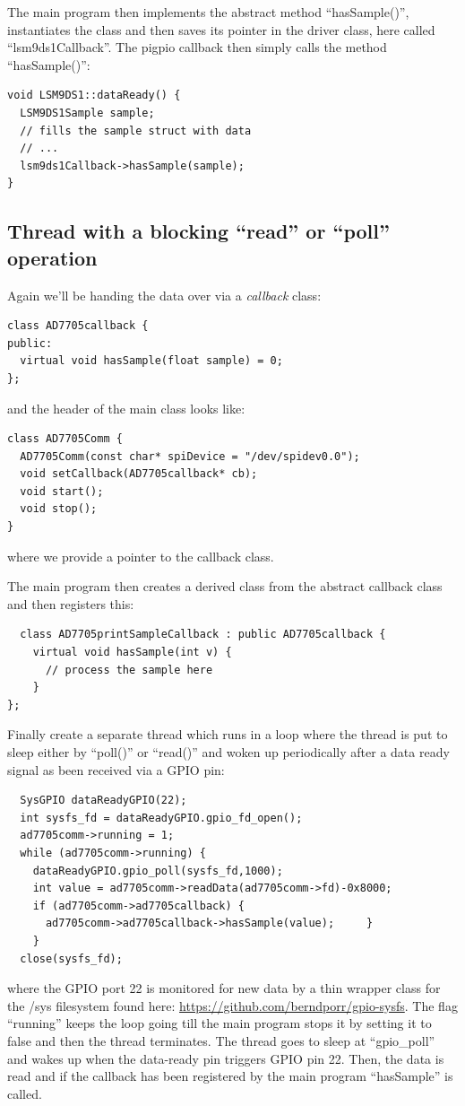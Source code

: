 \documentclass[12pt]{report}
\begin{document}
The main program then implements the abstract method ``hasSample()'', instantiates
the class and then saves its pointer in the driver class, here called ``lsm9ds1Callback''.
The pigpio callback then simply calls the method ``hasSample()'':
\begin{verbatim}
void LSM9DS1::dataReady() {
  LSM9DS1Sample sample;
  // fills the sample struct with data
  // ...
  lsm9ds1Callback->hasSample(sample);
}
\end{verbatim}

\subsection{Thread with a blocking ``read'' or ``poll'' operation}
Again we'll be handing the data over via a \textsl{callback} class:
\begin{verbatim}
class AD7705callback {
public:
  virtual void hasSample(float sample) = 0;
};
\end{verbatim}

and the header of the main class looks like:
\begin{verbatim}
class AD7705Comm {
  AD7705Comm(const char* spiDevice = "/dev/spidev0.0");
  void setCallback(AD7705callback* cb);
  void start();
  void stop();
}
\end{verbatim}
where we provide a pointer to the callback class.

The main program then creates a derived class from the
abstract callback class and then registers this:
\begin{verbatim}
  class AD7705printSampleCallback : public AD7705callback {
    virtual void hasSample(int v) {
      // process the sample here
    }
};
\end{verbatim}

Finally create a separate thread which runs in a loop
where the thread is put to sleep either by ``poll()'' or ``read()''
and woken up periodically after a data ready
signal as been received via a GPIO pin:
\begin{verbatim}
  SysGPIO dataReadyGPIO(22);
  int sysfs_fd = dataReadyGPIO.gpio_fd_open();	
  ad7705comm->running = 1;
  while (ad7705comm->running) {
    dataReadyGPIO.gpio_poll(sysfs_fd,1000);
    int value = ad7705comm->readData(ad7705comm->fd)-0x8000;
    if (ad7705comm->ad7705callback) {
      ad7705comm->ad7705callback->hasSample(value);		}
    }
  close(sysfs_fd);
\end{verbatim}
where the GPIO port 22 is monitored for new data by a thin wrapper class for the /sys filesystem
found here: \url{https://github.com/berndporr/gpio-sysfs}. The flag ``running'' keeps
the loop going till the main program stops it by setting it to false and then the thread
terminates. The thread goes to sleep at ``gpio\_poll'' and wakes up when the data-ready
pin triggers GPIO pin 22. Then, the data is read and if the callback has been registered
by the main program ``hasSample'' is called.
\end{document}
